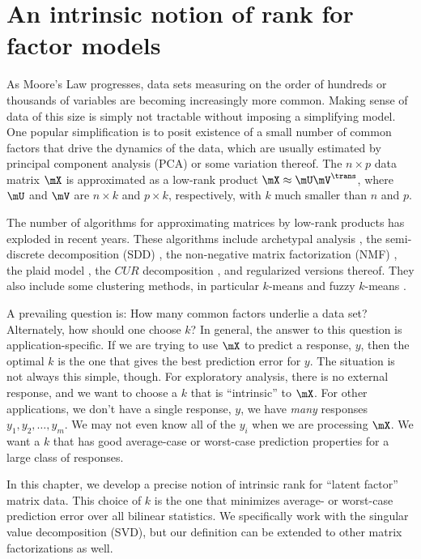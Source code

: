 
\chapter{An intrinsic notion of rank for factor models}
\label{C:intrinsic-rank}

As Moore's Law progresses, data sets measuring on the order of hundreds or
thousands of variables are becoming increasingly more common. Making sense of
data of this size is simply not tractable without imposing a simplifying
model. One popular simplification is to posit existence of a small number of
common factors that drive the dynamics of the data, which are usually
estimated by principal component analysis (PCA) or some variation thereof.
The $n \times p$ data matrix $\mX$ is approximated as a low-rank product $\mX
\approx \mU \mV^\trans$, where $\mU$ and $\mV$ are $n \times k$ and $p \times
k$, respectively, with $k$ much smaller than $n$ and $p$.

The number of algorithms for approximating matrices by low-rank products has
exploded in recent years. These algorithms include archetypal analysis
\cite{cutler1994aa}, the semi-discrete decomposition (SDD)
\cite{kolda1998smd}, the non-negative matrix factorization (NMF)
\cite{lee1999lpo}, the plaid model \cite{lazzeroni2002pmg}, the $CUR$
decomposition \cite{drineas2007fmc}, and regularized versions thereof. They
also include some clustering methods, in particular $k$-means and fuzzy
$k$-means \cite{bezdek1980fmp}.

A prevailing question is: How many common factors underlie a data set? Alternately, how should one choose $k$? In general, the answer to this question is
application-specific. If we are trying to use $\mX$ to predict a response,
$y$, then the optimal $k$ is the one that gives the best prediction error
for $y$. The situation is not always this simple, though. For exploratory
analysis, there is no external response, and we want to choose a $k$ that is
``intrinsic'' to $\mX$. For other applications, we don't have a single
response, $y$, we have \emph{many} responses $y_1, y_2, \ldots, y_m$.
We may not even know all of the $y_i$ when we are processing $\mX$. We want a $k$ that has good average-case or worst-case prediction properties for a large class of responses.

In this chapter, we develop a precise notion of intrinsic rank for ``latent
factor'' matrix data. This choice of $k$ is the one that minimizes average- or
worst-case prediction error over all bilinear statistics. We specifically work
with the singular value decomposition (SVD), but our definition can be
extended to other matrix factorizations as well.

